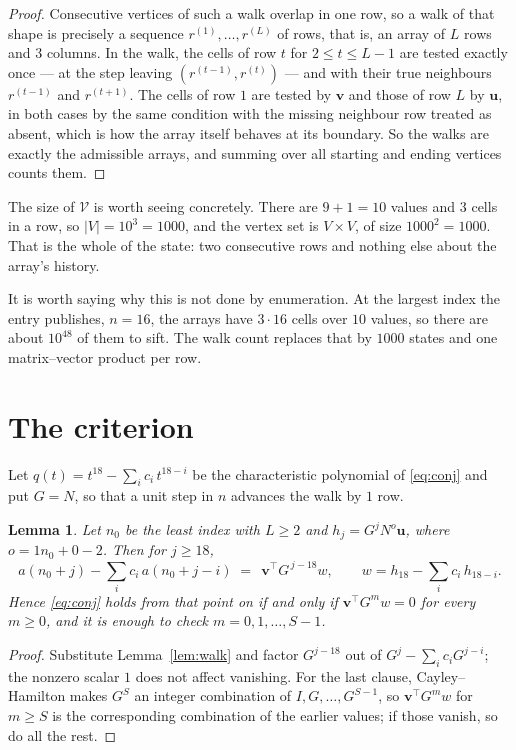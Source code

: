 \documentclass[11pt,a4paper]{article}
\theoremstyle{plain}
\newtheorem{lemma}[theorem]{Lemma}
\theoremstyle{definition}
\begin{document}
\begin{proof}
Consecutive vertices of such a walk overlap in one row, so a walk of that shape is
precisely a sequence $r^{(1)},\dots,r^{(L)}$ of rows, that is, an array of $L$ rows
and $3$ columns. In the walk, the cells of row $t$ for $2\le t\le L-1$ are tested
exactly once --- at the step leaving $(r^{(t-1)},r^{(t)})$ --- and with their true
neighbours $r^{(t-1)}$ and $r^{(t+1)}$. The cells of row $1$ are tested by
$\mathbf{v}$ and those of row $L$ by $\mathbf{u}$, in both cases by the same condition
with the missing neighbour row treated as absent, which is how the array itself behaves at
its boundary. So the walks are exactly the admissible arrays, and summing over all starting
and ending vertices counts them.
\end{proof}


The size of $\mathcal V$ is worth seeing concretely. There are $9+1=10$ values
and $3$ cells in a row, so $|V|=10^{3}=1000$, and the vertex set is
$V\times V$, of size $1000^2=1000$. That is the whole of the state: two consecutive
rows and nothing else about the array's history.

It is worth saying why this is not done by enumeration. At the largest index the entry
publishes, $n=16$, the arrays have $3\cdot16$ cells over
$10$ values, so there are about $10^{48}$ of them to sift. The
walk count replaces that by $1000$ states and one matrix--vector product per row.
\section{The criterion}

Let $q(t)=t^{18}-\sum_i c_i\,t^{18-i}$ be the characteristic polynomial of
\eqref{eq:conj} and put $G=N$, so that a unit step in $n$ advances the walk by
$1$ row.

\begin{lemma}\label{lem:crit}
Let $n_0$ be the least index with $L\ge2$ and $h_j=G^{j}N^{o}\mathbf{u}$, where
$o=1n_0+0-2$. Then for $j\ge18$,
\[
a(n_0+j)-\sum_i c_i\,a(n_0+j-i)\;=\;\,\mathbf{v}^{\!\top}G^{\,j-18}w,
\qquad w=h_{18}-\sum_i c_i\,h_{18-i} .
\]
Hence \eqref{eq:conj} holds from that point on if and only if
$\mathbf{v}^{\!\top}G^{m}w=0$ for every $m\ge0$, and it is enough to check
$m=0,1,\dots,S-1$.
\end{lemma}

\begin{proof}
Substitute Lemma~\ref{lem:walk} and factor $G^{j-18}$ out of
$G^{j}-\sum_ic_iG^{j-i}$; the nonzero scalar $1$ does not affect
vanishing. For the last clause, Cayley--Hamilton makes $G^{S}$ an integer combination of
$I,G,\dots,G^{S-1}$, so $\mathbf{v}^{\!\top}G^{m}w$ for $m\ge S$ is the corresponding
combination of the earlier values; if those vanish, so do all the rest.
\end{proof}
\end{document}

